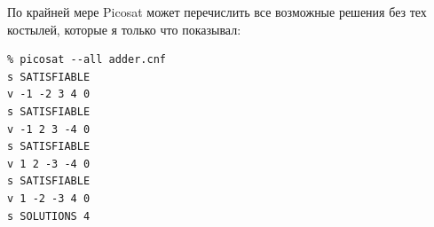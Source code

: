 По крайней мере Picosat может перечислить все возможные решения без тех костылей, которые я только что показывал:

\begin{lstlisting}
% picosat --all adder.cnf
s SATISFIABLE
v -1 -2 3 4 0
s SATISFIABLE
v -1 2 3 -4 0
s SATISFIABLE
v 1 2 -3 -4 0
s SATISFIABLE
v 1 -2 -3 4 0
s SOLUTIONS 4
\end{lstlisting}









%

